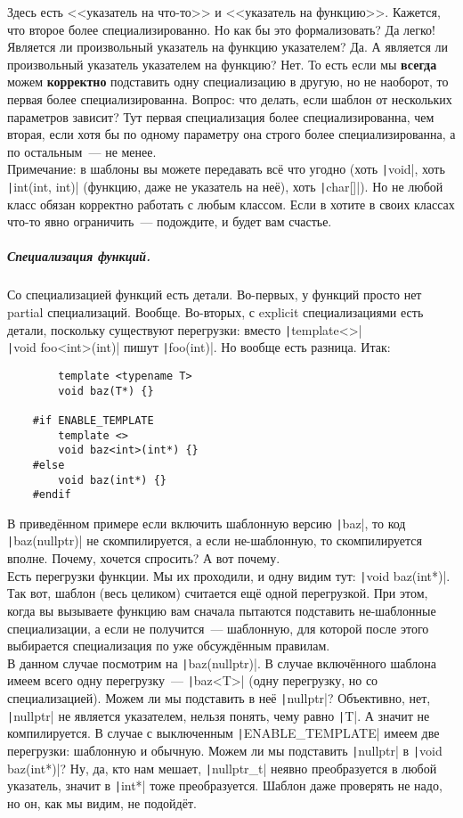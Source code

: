 \documentclass{article}
\begin{document}
    Здесь есть <<указатель на что-то>> и <<указатель на функцию>>. Кажется, что второе более специализированно. Но как бы это формализовать? Да легко! Является ли произвольный указатель на функцию указателем? Да. А является ли произвольный указатель указателем на функцию? Нет. То есть если мы \textbf{всегда} можем \textbf{корректно} подставить одну специализацию в другую, но не наоборот, то первая более специализированна. Вопрос: что делать, если шаблон от нескольких параметров зависит? Тут первая специализация более специализированна, чем вторая, если хотя бы по одному параметру она строго более специализированна, а по остальным~--- не менее.\\
    Примечание: в шаблоны вы можете передавать всё что угодно (хоть \texttt|void|, хоть \texttt|int(int, int)| (функцию, даже не указатель на неё), хоть \texttt|char[]|). Но не любой класс обязан корректно работать с любым классом. Если в хотите в своих классах что-то явно ограничить~--- подождите, и будет вам счастье.\\
    \subparagraph{Специализация функций.}
    Со специализацией функций есть детали. Во-первых, у функций просто нет partial специализаций. Вообще. Во-вторых, с explicit специализациями есть детали, поскольку существуют перегрузки: вместо \texttt|template<>|\\\texttt|void foo<int>(int)| пишут \texttt|foo(int)|. Но вообще есть разница. Итак:
    \begin{verbatim}
        template <typename T>
        void baz(T*) {}

    #if ENABLE_TEMPLATE
        template <>
        void baz<int>(int*) {}
    #else
        void baz(int*) {}
    #endif
    \end{verbatim}
    В приведённом примере если включить шаблонную версию \texttt|baz|, то код \texttt|baz(nullptr)| не скомпилируется, а если не-шаблонную, то скомпилируется вполне. Почему, хочется спросить? А вот почему.\\
    Есть перегрузки функции. Мы их проходили, и одну видим тут: \texttt|void baz(int*)|. Так вот, шаблон (весь целиком) считается ещё одной перегрузкой. При этом, когда вы вызываете функцию вам сначала пытаются подставить не-шаблонные специализации, а если не получится~--- шаблонную, для которой после этого выбирается специализация по уже обсуждённым правилам.\\
    В данном случае посмотрим на \texttt|baz(nullptr)|. В случае включённого шаблона имеем всего одну перегрузку~--- \texttt|baz<T>| (одну перегрузку, но со специализацией). Можем ли мы подставить в неё \texttt|nullptr|? Объективно, нет, \texttt|nullptr| не является указателем, нельзя понять, чему равно \texttt|T|. А значит не компилируется. В случае с выключенным \texttt|ENABLE_TEMPLATE| имеем две перегрузки: шаблонную и обычную. Можем ли мы подставить \texttt|nullptr| в \texttt|void baz(int*)|? Ну, да, кто нам мешает, \texttt|nullptr_t| неявно преобразуется в любой указатель, значит в \texttt|int*| тоже преобразуется. Шаблон даже проверять не надо, но он, как мы видим, не подойдёт.\\
\end{document}

